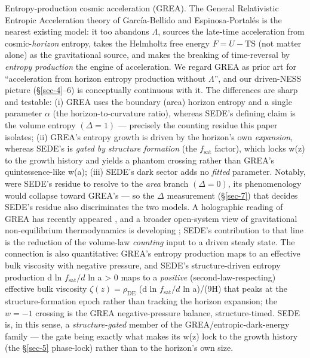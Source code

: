 \documentclass[aps,prd,preprint,nofootinbib,superscriptaddress]{revtex4-2}
\begin{document}
Entropy-production cosmic acceleration (GREA). The General Relativistic
Entropic Acceleration theory of García-Bellido and Espinosa-Portalés
\cite{Garcia-Bellido:2021idr, Espinosa-Portales:2021cac} is the nearest
existing model: it too abandons \(\Lambda\), sources the late-time
acceleration from cosmic-\emph{horizon} entropy, takes the Helmholtz
free energy \(F = U - \mathrm{TS}\) (not matter alone) as the
gravitational source, and makes the breaking of time-reversal by
\emph{entropy production} the engine of acceleration. We regard GREA as
prior art for ``acceleration from horizon entropy production without
\(\Lambda\)'', and our driven-NESS picture (§\ref{sec-4}--6) is
conceptually continuous with it. The differences are sharp and testable:
(i) GREA uses the boundary (area) horizon entropy and a single parameter
\(\alpha\) (the horizon-to-curvature ratio), whereas SEDE's defining
claim is the volume entropy \((\Delta  = 1)\) --- precisely the counting
residue this paper isolates; (ii) GREA's entropy growth is driven by the
horizon's own \emph{expansion}, whereas SEDE's is \emph{gated by
structure formation} (the \(f_{\mathrm{sat}}\) factor), which locks w(z)
to the growth history and yields a phantom crossing rather than GREA's
quintessence-like w(a); (iii) SEDE's dark sector adds no \emph{fitted}
parameter. Notably, were SEDE's residue to resolve to the \emph{area}
branch \((\Delta  = 0)\), its phenomenology would collapse toward GREA's
--- so the \(\Delta\) measurement (§\ref{sec-7}) that decides SEDE's
residue also discriminates the two models. A holographic reading of GREA
has recently appeared \cite{GarciaBellido:2025grea}, and a broader
open-system view of gravitational non-equilibrium thermodynamics is
developing \cite{Farooq:2011zz, AguiSalcedo:2025open}; SEDE's
contribution to that line is the reduction of the volume-law
\emph{counting} input to a driven steady state. The connection is also
quantitative: GREA's entropy production maps to an effective bulk
viscosity with negative pressure, and SEDE's structure-driven entropy
production d ln \(f_{\mathrm{sat}}/d\) ln a \textgreater{} 0 maps to a
\emph{positive} (second-law-respecting) effective bulk viscosity
\(\zeta (z) = \rho _\mathrm{DE}\) (d ln \(f_{\mathrm{sat}}/d\) ln
a)/(9H) that peaks at the structure-formation epoch rather than tracking
the horizon expansion; the \(w = -1\) crossing is the GREA
negative-pressure balance, structure-timed. SEDE is, in this sense, a
\emph{structure-gated} member of the GREA/entropic-dark-energy family
--- the gate being exactly what makes its w(z) lock to the growth
history (the §\ref{sec-5} phase-lock) rather than to the horizon's own
size.
\end{document}
